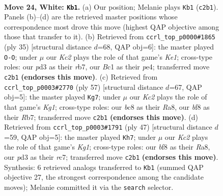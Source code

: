 \documentclass[11pt]{article}
\begin{document}
\clearpage

\begin{figure}[p]\centering
\begin{subfigure}{0.46\textwidth}\centering
\resizebox{\linewidth}{!}{%
\newchessgame
\chessboard[
  setfen={r1b1kb1r/5p2/4p3/4n1P1/p6p/P2p4/R1K3PP/2B2NNR w kq - 0 24},
  showmover=false,
  pgfstyle=straightmove, color=movearrow, markmove={c2-b1}
]}
\caption{}
\end{subfigure}\hfill
\begin{subfigure}{0.46\textwidth}\centering
\resizebox{\linewidth}{!}{%
\newchessgame
\chessboard[
  setfen={r3k2r/1R1n1pp1/p3b3/6Pp/4P3/2N4P/P1P5/4KB1R b Kkq - 0 18},
  showmover=false,
  pgfstyle=straightmove, color=movearrow, markmove={e8-g8}
]}
\caption{}
\end{subfigure}
\\[4pt]
\begin{subfigure}{0.46\textwidth}\centering
\resizebox{\linewidth}{!}{%
\newchessgame
\chessboard[
  setfen={r5k1/1r3p2/2N1pb1p/p2n2p1/3B4/P4P2/KP1R2PP/2R5 b - - 1 29},
  showmover=false,
  pgfstyle=straightmove, color=movearrow, markmove={g8-g7}
]}
\caption{}
\end{subfigure}\hfill
\begin{subfigure}{0.46\textwidth}\centering
\resizebox{\linewidth}{!}{%
\newchessgame
\chessboard[
  setfen={r2r2k1/2R2pp1/4b2p/p1P1p3/2n1P2P/P1P2PN1/5KP1/2B4R b - - 3 24},
  showmover=false,
  pgfstyle=straightmove, color=movearrow, markmove={g8-h7}
]}
\caption{}
\end{subfigure}
\caption{\textbf{Move 24, White: \texttt{Kb1}.} (a) Our position; Melanie plays \texttt{Kb1} (\texttt{c2b1}). Panels (b)--(d) are the retrieved master positions whose correspondence most drove this move (highest QAP objective among those that transfer to it). (b) Retrieved from \texttt{ccrl\_top\_p0000\#1865} (ply 35) [structural distance $d$=68, QAP obj=6]: the master played \texttt{O-O}; under $\mu$ our \emph{Kc2} plays the role of that game's \emph{Ke1}; cross-type roles: our \emph{p}d3 as their \emph{r}b7, our \emph{B}c1 as their \emph{p}e4; transferred move \texttt{c2b1} \textbf{(endorses this move)}. (c) Retrieved from \texttt{ccrl\_top\_p0003\#2770} (ply 57) [structural distance $d$=67, QAP obj=5]: the master played \texttt{Kg7}; under $\mu$ our \emph{Kc2} plays the role of that game's \emph{Kg1}; cross-type roles: our \emph{b}c8 as their \emph{R}a8, our \emph{b}f8 as their \emph{R}b7; transferred move \texttt{c2b1} \textbf{(endorses this move)}. (d) Retrieved from \texttt{ccrl\_top\_p0003\#1791} (ply 47) [structural distance $d$=59, QAP obj=5]: the master played \texttt{Kh7}; under $\mu$ our \emph{Kc2} plays the role of that game's \emph{Kg1}; cross-type roles: our \emph{b}f8 as their \emph{R}a8, our \emph{p}d3 as their \emph{r}c7; transferred move \texttt{c2b1} \textbf{(endorses this move)}. Synthesis: 6 retrieved analogs transferred to \texttt{Kb1} (summed QAP objective 27, the strongest correspondence among the candidate moves); Melanie committed it via the \texttt{search} selector.}
\label{fig:thought-m46}
\end{figure}
\end{document}
